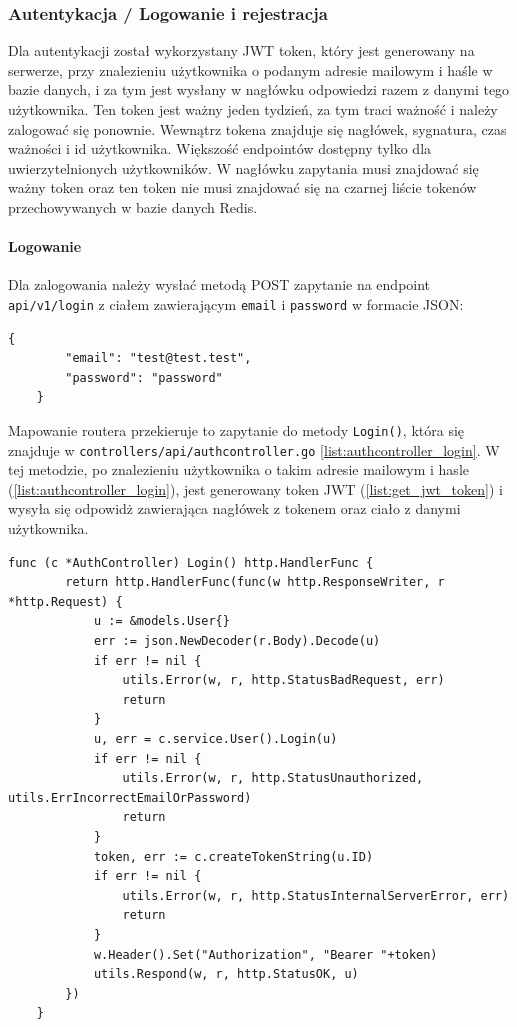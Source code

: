 \subsubsection{Autentykacja / Logowanie i rejestracja}
\label{sec:autentykacja}
Dla autentykacji został wykorzystany JWT token, który jest generowany na serwerze, przy znalezieniu użytkownika o podanym adresie mailowym i haśle w bazie danych, i za tym jest wysłany w nagłówku odpowiedzi razem z danymi tego użytkownika.
Ten token jest ważny jeden tydzień, za tym traci ważność i należy zalogować się ponownie. Wewnątrz tokena znajduje się nagłówek, sygnatura, czas ważności i id użytkownika.
Większość endpointów dostępny tylko dla uwierzytelnionych użytkowników. W nagłówku zapytania musi znajdować się ważny token oraz ten token nie musi znajdować się na czarnej liście tokenów przechowywanych w bazie danych Redis.

\paragraph{Logowanie\newline}
Dla zalogowania należy wysłać metodą POST zapytanie na endpoint \texttt{api/v1/login} z ciałem zawierającym \texttt{email} i \texttt{password} w formacie JSON:
\begin{lstlisting}[basicstyle=\tiny\ttfamily]
    {
        "email": "test@test.test",
        "password": "password"
    }
\end{lstlisting}

Mapowanie routera przekieruje to zapytanie do metody \texttt{Login()}, która się znajduje w \texttt{controllers/api/authcontroller.go} \ref{list:authcontroller_login}.
W tej metodzie, po znalezieniu użytkownika o takim adresie mailowym i hasle (\ref{list:authcontroller_login}), jest generowany token JWT (\ref{list:get_jwt_token}) i wysyła się odpowidż zawierająca nagłówek z tokenem oraz ciało z danymi użytkownika.
\begin{lstlisting}[label=list:authcontroller_login,caption=Kontroller logowania użytkownika,basicstyle=\tiny\ttfamily]
    func (c *AuthController) Login() http.HandlerFunc {
        return http.HandlerFunc(func(w http.ResponseWriter, r *http.Request) {
            u := &models.User{}
            err := json.NewDecoder(r.Body).Decode(u)
            if err != nil {
                utils.Error(w, r, http.StatusBadRequest, err)
                return
            }
            u, err = c.service.User().Login(u)
            if err != nil {
                utils.Error(w, r, http.StatusUnauthorized, utils.ErrIncorrectEmailOrPassword)
                return
            }
            token, err := c.createTokenString(u.ID)
            if err != nil {
                utils.Error(w, r, http.StatusInternalServerError, err)
                return
            }
            w.Header().Set("Authorization", "Bearer "+token)
            utils.Respond(w, r, http.StatusOK, u)
        })
    }
\end{lstlisting}

